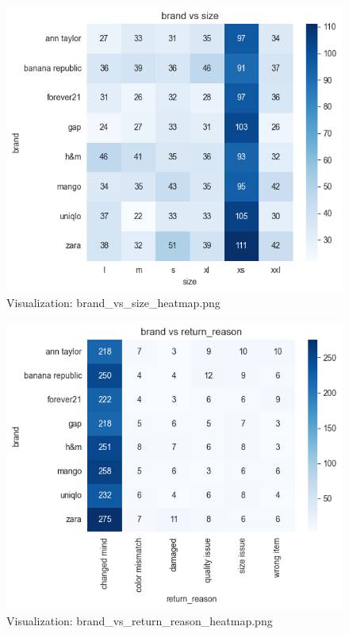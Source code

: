 \documentclass{article}%
\begin{document}
\vspace{10pt}%
\\%
\begin{minipage}[c]{0.48\textwidth}%


\begin{figure}[H]%
\centering%
\includegraphics[width=\linewidth]{output/plots/brand_vs_size_heatmap.png}%
\caption{Visualization: brand\_vs\_size\_heatmap.png}%
\end{figure}

%
\end{minipage}%
\begin{minipage}[c]{0.48\textwidth}%


\begin{figure}[H]%
\centering%
\includegraphics[width=\linewidth]{output/plots/brand_vs_return_reason_heatmap.png}%
\caption{Visualization: brand\_vs\_return\_reason\_heatmap.png}%
\end{figure}

%
\end{minipage}%
\end{document}
